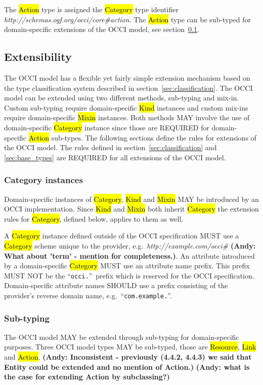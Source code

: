 \documentclass[10pt,a4paper]{article}
\begin{document}
The \hl{Action} type is assigned the \hl{Category} type identifier
\textit{http://schemas.ogf.org/occi/core\#action}.
%
The \hl{Action} type can be sub-typed for domain-specific extensions of the
OCCI model, see section~\ref{sec:extensibility}.

\subsection{Extensibility}
\label{sec:extensibility}
The OCCI model has a flexible yet fairly simple extension mechanism based on
the type classification system described in section~\ref{sec:classification}.
%
The OCCI model can be extended using two different methods, sub-typing and
mix-in. Custom sub-typing require domain-specific \hl{Kind} instances and
custom mix-ins require domain-specific \hl{Mixin} instances.  Both methods MAY
involve the use of domain-specific \hl{Category} instance since those are
REQUIRED for domain-specific \hl{Action} sub-types.  The following sections
define the rules for extensions of the OCCI model.
%
The rules defined in section~\ref{sec:classification} and \ref{sec:base_types}
are REQUIRED for all extensions of the OCCI model.

\subsubsection{Category instances}
\label{sec:ext:category}
Domain-specific instances of \hl{Category}, \hl{Kind} and \hl{Mixin} MAY be
introduced by an OCCI implementation. Since \hl{Kind} and \hl{Mixin} both
inherit \hl{Category} the extension rules for \hl{Category}, defined below,
applies to them as well.

A \hl{Category} instance defined outside of the OCCI specification MUST use a
\hl{Category} scheme unique to the provider,
e.g.~\textit{http://example.com/occi\#} \textbf{(Andy: What about 'term' - mention for completeness.)}.
%
An attribute introduced by a domain-specific \hl{Category} MUST
use an attribute name prefix. This prefix MUST NOT be the ``\texttt{occi.}''~prefix
which is reserved for the OCCI specification. Domain-specific attribute names
SHOULD use a prefix consisting of the provider's reverse domain name,
e.g.~``\texttt{com.example.}''.

\subsubsection{Sub-typing}
The OCCI model MAY be extended through sub-typing for domain-specific purposes.
Three OCCI model types MAY be sub-typed, those are \hl{Resource}, \hl{Link} and
\hl{Action}. \textbf{(Andy: Inconsistent - previously (4.4.2, 4.4.3) we said that Entity 
could be extended and no mention of Action.)} 
\textbf{(Andy: what is the case for extending Action by subclassing?)}
\end{document}
